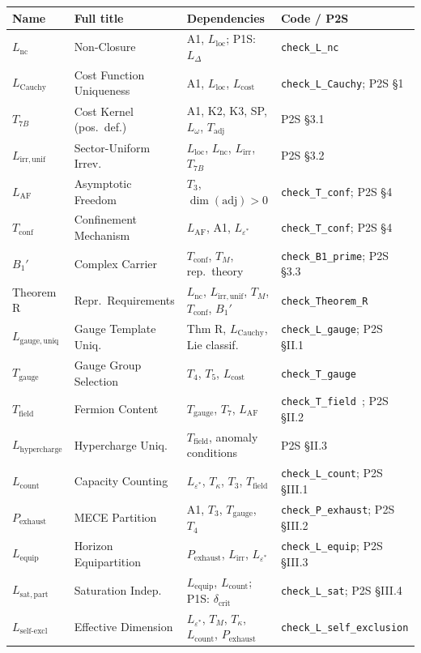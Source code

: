 \documentclass[11pt]{article}
\begin{document}
\begin{center}
\footnotesize
\begin{tabular}{lp{3.2cm}p{4.5cm}l}
\toprule
\textbf{Name} & \textbf{Full title} & \textbf{Dependencies} & \textbf{Code / P2S} \\
\midrule
$L_{\mathrm{nc}}$ & Non-Closure & A1, $L_{\mathrm{loc}}$; P1S: $L_\Delta$ & \texttt{check\_L\_nc} \\
$L_{\mathrm{Cauchy}}$ & Cost Function Uniqueness & A1, $L_{\mathrm{loc}}$, $L_{\mathrm{cost}}$ & \texttt{check\_L\_Cauchy}; P2S \S1 \\
$T_{7B}$ & Cost Kernel (pos.\ def.) & A1, K2, K3, SP, $L_\omega$, $T_{\mathrm{adj}}$ & P2S \S3.1 \\
$L_{\mathrm{irr,unif}}$ & Sector-Uniform Irrev. & $L_{\mathrm{loc}}$, $L_{\mathrm{nc}}$, $L_{\mathrm{irr}}$, $T_{7B}$ & P2S \S3.2 \\
$L_{\mathrm{AF}}$ & Asymptotic Freedom & $T_3$, $\dim(\mathrm{adj}) > 0$ & \texttt{check\_T\_conf}; P2S \S4 \\
$T_{\mathrm{conf}}$ & Confinement Mechanism & $L_{\mathrm{AF}}$, A1, $L_{\varepsilon^*}$ & \texttt{check\_T\_conf}; P2S \S4 \\
$B_1'$ & Complex Carrier & $T_{\mathrm{conf}}$, $T_M$, rep.\ theory & \texttt{check\_B1\_prime}; P2S \S3.3 \\
Theorem R & Repr.\ Requirements & $L_{\mathrm{nc}}$, $L_{\mathrm{irr,unif}}$, $T_M$, $T_{\mathrm{conf}}$, $B_1'$ & \texttt{check\_Theorem\_R} \\
$L_{\mathrm{gauge,uniq}}$ & Gauge Template Uniq. & Thm R, $L_{\mathrm{Cauchy}}$, Lie classif. & \texttt{check\_L\_gauge}; P2S \S II.1 \\
$T_{\mathrm{gauge}}$ & Gauge Group Selection & $T_4$, $T_5$, $L_{\mathrm{cost}}$ & \texttt{check\_T\_gauge} \\
$T_{\mathrm{field}}$ & Fermion Content & $T_{\mathrm{gauge}}$, $T_7$, $L_{\mathrm{AF}}$ & \texttt{check\_T\_field}~\cite{BrookeFermionScan}; P2S \S II.2 \\
$L_{\mathrm{hypercharge}}$ & Hypercharge Uniq. & $T_{\mathrm{field}}$, anomaly conditions & P2S \S II.3 \\
$L_{\mathrm{count}}$ & Capacity Counting & $L_{\varepsilon^*}$, $T_\kappa$, $T_3$, $T_{\mathrm{field}}$ & \texttt{check\_L\_count}; P2S \S III.1 \\
$P_{\mathrm{exhaust}}$ & MECE Partition & A1, $T_3$, $T_{\mathrm{gauge}}$, $T_4$ & \texttt{check\_P\_exhaust}; P2S \S III.2 \\
$L_{\mathrm{equip}}$ & Horizon Equipartition & $P_{\mathrm{exhaust}}$, $L_{\mathrm{irr}}$, $L_{\varepsilon^*}$ & \texttt{check\_L\_equip}; P2S \S III.3 \\
$L_{\mathrm{sat,part}}$ & Saturation Indep. & $L_{\mathrm{equip}}$, $L_{\mathrm{count}}$; P1S: $\delta_{\mathrm{crit}}$ & \texttt{check\_L\_sat}; P2S \S III.4 \\
$L_{\mathrm{self\text{-}excl}}$ & Effective Dimension & $L_{\varepsilon^*}$, $T_M$, $T_\kappa$, $L_{\mathrm{count}}$, $P_{\mathrm{exhaust}}$ & \texttt{check\_L\_self\_exclusion} \\
\bottomrule
\end{tabular}
\end{center}
\end{document}
